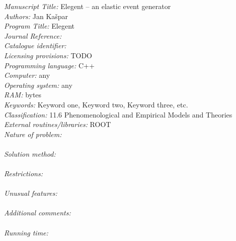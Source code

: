 \documentclass[preprint,12pt]{elsarticle}
\begin{document}
\begin{small}
\noindent
{\em Manuscript Title:} Elegent -- an elastic event generator\\
{\em Authors:} Jan Ka\v spar\\
{\em Program Title:} Elegent\\
{\em Journal Reference:}\\ %
{\em Catalogue identifier:}\\ %
{\em Licensing provisions:} TODO\\ %
{\em Programming language:} C++\\
{\em Computer:} any\\
{\em Operating system:} any\\
{\em RAM:} bytes\\
{\em Keywords:} Keyword one, Keyword two, Keyword three, etc.\\ %
{\em Classification:} 11.6 Phenomenological and Empirical Models and Theories\\ %
{\em External routines/libraries:} ROOT\\
{\em Nature of problem:}\\
\\
{\em Solution method:}\\
\\
{\em Restrictions:}\\
\\
{\em Unusual features:}\\
\\
{\em Additional comments:}\\
\\
{\em Running time:}\\
\\

\iffalse
\begin{thebibliography}{0}
\bibitem{1}Reference 1         %
\bibitem{2}Reference 2         %
\bibitem{3}Reference 3         %
\end{thebibliography}
\fi

\end{small}
\end{document}
